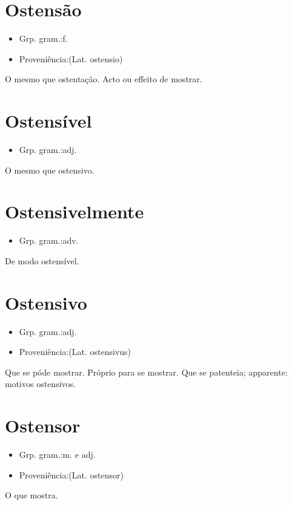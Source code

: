 \section{Ostensão}
\begin{itemize}
\item {Grp. gram.:f.}
\end{itemize}
\begin{itemize}
\item {Proveniência:(Lat. \textunderscore ostensio\textunderscore )}
\end{itemize}
O mesmo que \textunderscore ostentação\textunderscore .
Acto ou effeito de mostrar.
\section{Ostensível}
\begin{itemize}
\item {Grp. gram.:adj.}
\end{itemize}
O mesmo que \textunderscore ostensivo\textunderscore .
\section{Ostensivelmente}
\begin{itemize}
\item {Grp. gram.:adv.}
\end{itemize}
De modo ostensível.
\section{Ostensivo}
\begin{itemize}
\item {Grp. gram.:adj.}
\end{itemize}
\begin{itemize}
\item {Proveniência:(Lat. \textunderscore ostensivus\textunderscore )}
\end{itemize}
Que se póde mostrar.
Próprio para se mostrar.
Que se patenteia; apparente: \textunderscore motivos ostensivos\textunderscore .
\section{Ostensor}
\begin{itemize}
\item {Grp. gram.:m.  e  adj.}
\end{itemize}
\begin{itemize}
\item {Proveniência:(Lat. \textunderscore ostensor\textunderscore )}
\end{itemize}
O que mostra.
